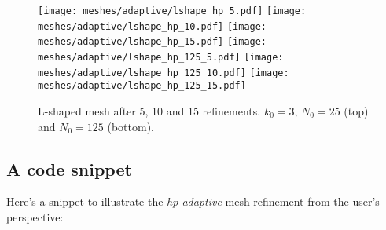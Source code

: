 \begin{figure}[!ht]
	\centering
	\texttt{[image: meshes/adaptive/lshape\_hp\_5.pdf]}
	\texttt{[image: meshes/adaptive/lshape\_hp\_10.pdf]}
	\texttt{[image: meshes/adaptive/lshape\_hp\_15.pdf]}
    \texttt{[image: meshes/adaptive/lshape\_hp\_125\_5.pdf]}
	\texttt{[image: meshes/adaptive/lshape\_hp\_125\_10.pdf]}
	\texttt{[image: meshes/adaptive/lshape\_hp\_125\_15.pdf]}
	\caption{L-shaped mesh after 5, 10 and 15 refinements. $k_0 = 3$, $N_0 = 25$ (top) and $N_0 = 125$ (bottom).}
\end{figure}

\newpage
\subsection{A code snippet}

Here's a snippet to illustrate the \textit{hp-adaptive} mesh refinement from the user's perspective:

